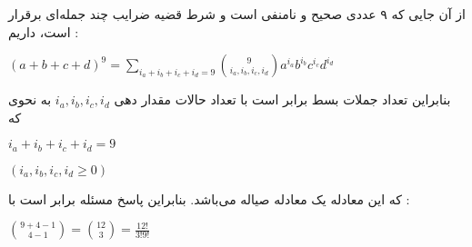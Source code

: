 از آن جایی که ۹ عددی صحیح و نا‌منفی است و شرط قضیه ضرایب چند جمله‌ای برقرار است، داریم :
\begin{center}
  $(a + b + c + d)^9 = \sum\limits_{i_a+i_b+i_c+i_d=9} \binom{9}{i_a,i_b,i_c,i_d} a^{i_a} b^{i_b} c^{i_c} d^{i_d}$
\end{center}
بنابراین تعداد جملات بسط برابر است با تعداد حالات مقدار دهی
$i_a,i_b,i_c,i_d$
به نحوی که
\begin{center}
  $i_a+i_b+i_c+i_d=9$
  
  $(i_a,i_b,i_c,i_d \geq 0)$
\end{center}
که این معادله یک معادله صیاله می‌باشد. بنابراین پاسخ مسئله برابر است با :
\begin{center}
  $\binom{9 + 4 - 1}{4 - 1} = \binom{12}{3} = \frac{12!}{3!9!}$
\end{center}  